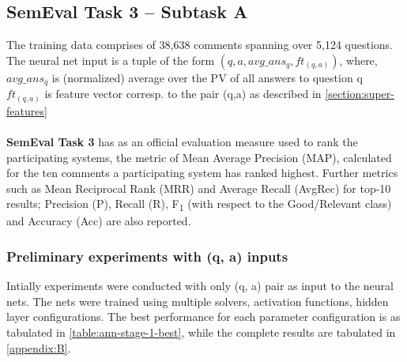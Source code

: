 \documentclass[12pt, a4paper, oneside]{Thesis} %
\begin{document}
\subsection{SemEval Task 3 -- Subtask A}

The training data comprises of 38,638 comments spanning over 5,124 questions. The neural net input is a tuple of the form $(q, a, avg\_ans_q, ft_{(q,a)})$, where, \\
\hspace*{1cm}$avg\_ans_q$ is (normalized) average over the PV of all answers to question q \\
\hspace*{1cm}$ft_{(q,a)}$ is feature vector corresp. to the pair (q,a) as described in \autoref{section:super-features}
\\\\
\textbf{SemEval Task 3} has as an official evaluation measure used to rank the participating systems, the metric of Mean Average Precision (MAP), calculated for the ten comments a participating system has ranked highest. Further metrics such as Mean Reciprocal Rank (MRR) and Average Recall (AvgRec) for top-10 results; Precision (P), Recall (R), F\textsubscript{1} (with respect to the Good/Relevant class) and Accuracy (Acc) are also reported.

\subsubsection{Preliminary experiments with (q, a) inputs}

Intially experiments were conducted with only (q, a) pair as input to the neural nets. The nets were trained using multiple solvers, activation functions, hidden layer configurations. The best performance for each parameter configuration is as tabulated in \autoref{table:ann-stage-1-best}, while the complete results are tabulated in \autoref{appendix:B}.
\end{document}
